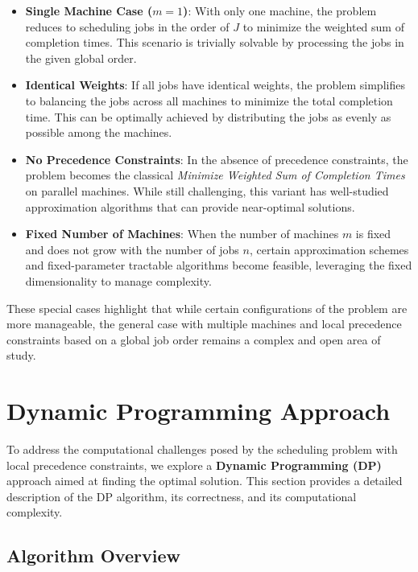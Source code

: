 \begin{itemize}
    \item \textbf{Single Machine Case ($m=1$)}: With only one machine, the problem reduces to scheduling jobs in the order of $J$ to minimize the weighted sum of completion times. This scenario is trivially solvable by processing the jobs in the given global order.

    \item \textbf{Identical Weights}: If all jobs have identical weights, the problem simplifies to balancing the jobs across all machines to minimize the total completion time. This can be optimally achieved by distributing the jobs as evenly as possible among the machines.

    \item \textbf{No Precedence Constraints}: In the absence of precedence constraints, the problem becomes the classical \emph{Minimize Weighted Sum of Completion Times} on parallel machines. While still challenging, this variant has well-studied approximation algorithms that can provide near-optimal solutions.

    \item \textbf{Fixed Number of Machines}: When the number of machines $m$ is fixed and does not grow with the number of jobs $n$, certain approximation schemes and fixed-parameter tractable algorithms become feasible, leveraging the fixed dimensionality to manage complexity.
\end{itemize}

These special cases highlight that while certain configurations of the problem are more manageable, the general case with multiple machines and local precedence constraints based on a global job order remains a complex and open area of study.


\section{Dynamic Programming Approach}

To address the computational challenges posed by the scheduling problem with local precedence constraints, we explore a \textbf{Dynamic Programming (DP)} approach aimed at finding the optimal solution. This section provides a detailed description of the DP algorithm, its correctness, and its computational complexity.

\subsection*{Algorithm Overview}

